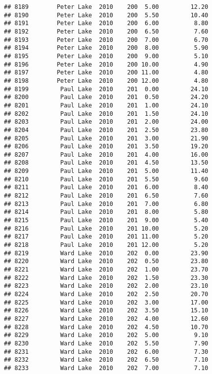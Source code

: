 \documentclass[
]{article}
\begin{document}
\begin{verbatim}
## 8189        Peter Lake  2010    200  5.00         12.20
## 8190        Peter Lake  2010    200  5.50         10.40
## 8191        Peter Lake  2010    200  6.00          8.80
## 8192        Peter Lake  2010    200  6.50          7.60
## 8193        Peter Lake  2010    200  7.00          6.70
## 8194        Peter Lake  2010    200  8.00          5.90
## 8195        Peter Lake  2010    200  9.00          5.10
## 8196        Peter Lake  2010    200 10.00          4.90
## 8197        Peter Lake  2010    200 11.00          4.80
## 8198        Peter Lake  2010    200 12.00          4.80
## 8199         Paul Lake  2010    201  0.00         24.10
## 8200         Paul Lake  2010    201  0.50         24.20
## 8201         Paul Lake  2010    201  1.00         24.10
## 8202         Paul Lake  2010    201  1.50         24.10
## 8203         Paul Lake  2010    201  2.00         24.00
## 8204         Paul Lake  2010    201  2.50         23.80
## 8205         Paul Lake  2010    201  3.00         21.90
## 8206         Paul Lake  2010    201  3.50         19.20
## 8207         Paul Lake  2010    201  4.00         16.00
## 8208         Paul Lake  2010    201  4.50         13.50
## 8209         Paul Lake  2010    201  5.00         11.40
## 8210         Paul Lake  2010    201  5.50          9.60
## 8211         Paul Lake  2010    201  6.00          8.40
## 8212         Paul Lake  2010    201  6.50          7.60
## 8213         Paul Lake  2010    201  7.00          6.80
## 8214         Paul Lake  2010    201  8.00          5.80
## 8215         Paul Lake  2010    201  9.00          5.40
## 8216         Paul Lake  2010    201 10.00          5.20
## 8217         Paul Lake  2010    201 11.00          5.20
## 8218         Paul Lake  2010    201 12.00          5.20
## 8219         Ward Lake  2010    202  0.00         23.90
## 8220         Ward Lake  2010    202  0.50         23.80
## 8221         Ward Lake  2010    202  1.00         23.70
## 8222         Ward Lake  2010    202  1.50         23.30
## 8223         Ward Lake  2010    202  2.00         23.10
## 8224         Ward Lake  2010    202  2.50         20.70
## 8225         Ward Lake  2010    202  3.00         17.00
## 8226         Ward Lake  2010    202  3.50         15.10
## 8227         Ward Lake  2010    202  4.00         12.60
## 8228         Ward Lake  2010    202  4.50         10.70
## 8229         Ward Lake  2010    202  5.00          9.10
## 8230         Ward Lake  2010    202  5.50          7.90
## 8231         Ward Lake  2010    202  6.00          7.30
## 8232         Ward Lake  2010    202  6.50          7.10
## 8233         Ward Lake  2010    202  7.00          7.10

\end{verbatim}
\end{document}

